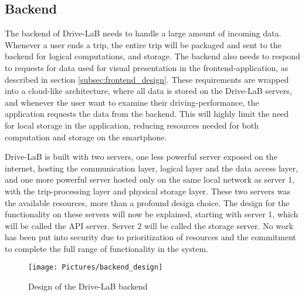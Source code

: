 \subsection{Backend}\label{subsec:backend_design}
The backend of Drive-LaB needs to handle a large amount of incoming data. Whenever a user ends a trip, the entire trip will be packaged and sent to the backend for logical computations, and storage. The backend also needs to respond to requests for data used for visual presentation in the frontend-application, as described in section \ref{subsec:frontend_design}. These requirements are wrapped into a cloud-like architecture, where all data is stored on the Drive-LaB servers, and whenever the user want to examine their driving-performance, the application requests the data from the backend. This will highly limit the need for local storage in the application, reducing resources needed for both computation and storage on the smartphone. 

Drive-LaB is built with two servers, one less powerful server exposed on the internet, hosting the communication layer, logical layer and the data access layer, and one more powerful server hosted only on the same local network as server 1, with the trip-processing layer and physical storage layer. These two servers was the available resources, more than a profound design choice. The design for the functionality on these servers will now be explained, starting with server 1, which will be called the API server. Server 2 will be called the storage server. No work has been put into security due to prioritization of resources and the commitment to complete the full range of functionality in the system.

\begin{figure}[tb]
\centering
\texttt{[image: Pictures/backend\_design]}
\caption{Design of the Drive-LaB backend}
\label{fig:backend_design}
\end{figure}